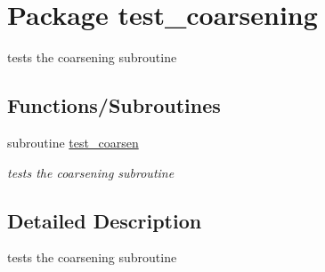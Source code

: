 \hypertarget{a00077}{
\section{Package test\_\-coarsening}
\label{a00077}
}
tests the coarsening subroutine  


\subsection*{Functions/Subroutines}
\begin{CompactItemize}
\item 
\hypertarget{a00077_c3d44ef75c9a289c353d75ef2650a204}{
subroutine \hyperlink{a00077_c3d44ef75c9a289c353d75ef2650a204}{test\_\-coarsen}}
\label{a00077_c3d44ef75c9a289c353d75ef2650a204}

\begin{CompactList}\small\item\em tests the coarsening subroutine \item\end{CompactList}\end{CompactItemize}


\subsection{Detailed Description}
tests the coarsening subroutine 

